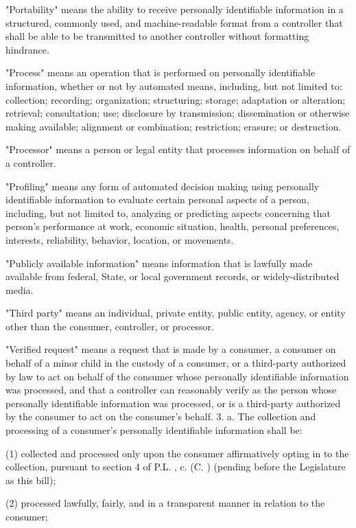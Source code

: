      "Portability" means the ability to receive personally identifiable information in a structured, commonly used, and machine-readable format from a controller that shall be able to be transmitted to another controller without formatting hindrance.

     "Process" means an operation that is performed on personally identifiable information, whether or not by automated means, including, but not limited to: collection; recording; organization; structuring; storage; adaptation or alteration; retrieval; consultation; use; disclosure by transmission; dissemination or otherwise making available; alignment or combination; restriction; erasure; or destruction.

     "Processor" means a person or legal entity that processes information on behalf of a controller.

     "Profiling" means any form of automated decision making using personally identifiable information to evaluate certain personal aspects of a person, including, but not limited to, analyzing or predicting aspects concerning that person's performance at work, economic situation, health, personal preferences, interests, reliability, behavior, location, or movements.

     "Publicly available information" means information that is lawfully made available from federal, State, or local government records, or widely-distributed media.

     "Third party" means an individual, private entity, public entity, agency, or entity other than the consumer, controller, or processor.

     "Verified request" means a request that is made by a consumer, a consumer on behalf of a minor child in the custody of a consumer, or a third-party authorized by law to act on behalf of the consumer whose personally identifiable information was processed, and that a controller can reasonably verify as the person whose personally identifiable information was processed, or is a third-party authorized by the consumer to act on the consumer's behalf.
     3.    a.  The collection and processing of a consumer's personally identifiable information shall be:

     (1)   collected and processed only upon the consumer affirmatively opting in to the collection, pursuant to section 4 of P.L.    , c.    (C.      ) (pending before the Legislature as this bill);

     (2)   processed lawfully, fairly, and in a transparent manner in relation to the consumer;

